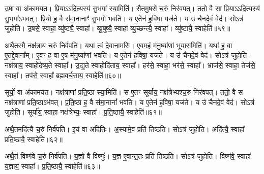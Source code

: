 उ॒षा वा अ॑कामयत।
प्रि॒या\-ऽऽदि॒त्यस्य॑ सु॒भगा᳚ स्या॒मिति॑।
सैतमु॒षसे॑ च॒रुं निर॑वपत्।
ततो॒ वै सा प्रि॒या\-ऽऽदि॒त्यस्य॑ सु॒भगा॑\-ऽभवत्।
प्रि॒यो ह॒ वै स॑मा॒नानाꣳ॑ सु॒भगो॑ भवति।
य ए॒तेन॑ ह॒विषा॒ यज॑ते।
य उ॑ चैनदे॒वं वेद॑।
सोऽत्र॑ जुहोति।
उ॒षसे॒ स्वाहा॒ व्यु॑ष्ट्यै॒ स्वाहा᳚।
व्यू॒षुष्यै॒ स्वाहा᳚ व्यु॒च्छन्त्यै॒ स्वाहा᳚।
व्यु॑ष्टायै॒ स्वाहेति॑॥५९॥

अथै॒तस्मै॒ नक्ष॑त्राय च॒रुं निर्व॑पति।
यथा॒ त्वं दे॒वाना॒मसि॑।
ए॒वम॒हं म॑नु॒ष्या॑णां भूयास॒मिति॑।
यथा॑ ह॒ वा ए॒तद्दे॒वाना᳚म्।
ए॒वꣳ ह॒ वा ए॒ष म॑नु॒ष्या॑णां भवति।
य ए॒तेन॑ ह॒विषा॒ यज॑ते।
य उ॑ चैनदे॒वं वेद॑।
सोऽत्र॑ जुहोति।
नक्ष॑त्राय॒ स्वाहो॑देष्य॒ते स्वाहा᳚।
उ॒द्य॒ते स्वाहोदि॑ताय॒ स्वाहा᳚।
हर॑से॒ स्वाहा॒ भर॑से॒ स्वाहा᳚।
भ्राज॑से॒ स्वाहा॒ तेज॑से॒ स्वाहा᳚।
तप॑से॒ स्वाहा᳚ ब्रह्मवर्च॒साय॒ स्वाहेति॑॥६०॥

सूर्यो॒ वा अ॑कामयत।
नक्ष॑त्राणां प्रति॒ष्ठा स्या॒मिति॑।
स ए॒तꣳ सूर्या॑य॒ नक्ष॑त्रेभ्यश्च॒रुं निर॑वपत्।
ततो॒ वै स नक्ष॑त्राणां प्रति॒ष्ठा\-ऽभ॑वत्।
प्र॒ति॒ष्ठा ह॒ वै स॑मा॒नानां᳚ भवति।
य ए॒तेन॑ ह॒विषा॒ यज॑ते।
य उ॑ चैनदे॒वं वेद॑।
सोऽत्र॑ जुहोति।
सूर्या॑य॒ स्वाहा॒ नक्ष॑त्रेभ्यः॒ स्वाहा᳚।
प्र॒ति॒ष्ठायै॒ स्वाहेति॑॥६१॥

अथै॒तमदि॑त्यै च॒रुं निर्व॑पति।
इ॒यं वा अदि॑तिः।
अ॒स्यामे॒व प्रति॑ तिष्ठति।
सोऽत्र॑ जुहोति।
अदि॑त्यै॒ स्वाहा᳚ प्रति॒ष्ठायै॒ स्वाहेति॑॥६२॥

अथै॒तं विष्ण॑वे च॒रुं निर्व॑पति।
य॒ज्ञो वै विष्णुः॑।
य॒ज्ञ ए॒वान्त॒तः प्रति॑ तिष्ठति।
सोऽत्र॑ जुहोति।
विष्ण॑वे॒ स्वाहा॑ य॒ज्ञाय॒ स्वाहा᳚।
प्र॒ति॒ष्ठायै॒ स्वाहेति॑॥६३॥




